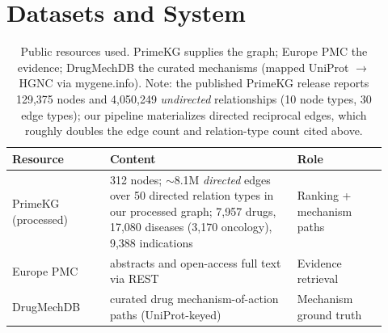 \documentclass[11pt]{article}
\begin{document}
\section{Datasets and System}

\begin{table}[H]
\centering\small
\begin{tabular}{>{\raggedright\arraybackslash}p{0.24\linewidth} >{\raggedright\arraybackslash}p{0.46\linewidth} >{\raggedright\arraybackslash}p{0.22\linewidth}}
\toprule
\rowcolor{sriblue}\color{white}\textbf{Resource} & \color{white}\textbf{Content} & \color{white}\textbf{Role}\\
\midrule
\rowcolor{srirow} PrimeKG (processed) & 129{,}312 nodes; $\sim$8.1M \emph{directed} edges over 50 directed relation types in our processed graph; 7{,}957 drugs, 17{,}080 diseases (3{,}170 oncology), 9{,}388 indications & Ranking + mechanism paths\\
Europe PMC & abstracts and open-access full text via REST & Evidence retrieval\\
\rowcolor{srirow} DrugMechDB & curated drug mechanism-of-action paths (UniProt-keyed) & Mechanism ground truth\\
\bottomrule
\end{tabular}
\caption{Public resources used. PrimeKG supplies the graph; Europe PMC the
evidence; DrugMechDB the curated mechanisms (mapped UniProt $\rightarrow$ HGNC via
mygene.info). Note: the published PrimeKG release reports 129{,}375 nodes and
4{,}050{,}249 \emph{undirected} relationships (10 node types, 30 edge types); our
pipeline materializes directed reciprocal edges, which roughly doubles the edge
count and relation-type count cited above.}
\label{tab:data}
\end{table}
\end{document}
